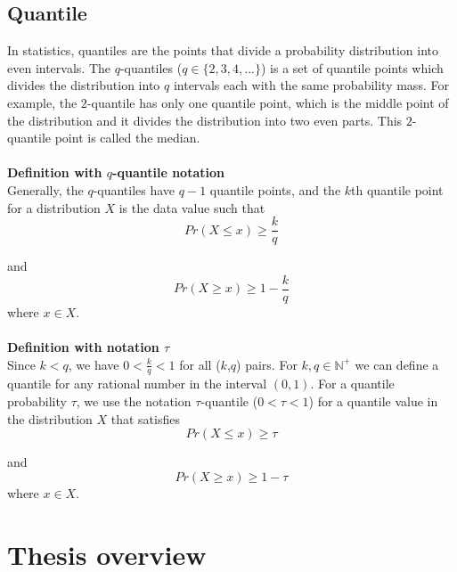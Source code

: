 \subsection{Quantile}
\label{subsec: quant}

In statistics, quantiles are the points that divide a probability distribution into even intervals.
The $q$-quantiles ($q \in \{2,3,4,...\}$) is a set of quantile points which divides the distribution into $q$ intervals each with the same probability mass.
For example, the $2$-quantile has only one quantile point, which is the middle point of the distribution
and it divides the distribution into two even parts. This $2$-quantile point is called the median.
        \\\\
    \textbf{Definition with $q$-quantile notation} \\
    Generally, the $q$-quantiles have $q-1$ quantile points, and the $k$th quantile point for a 
    distribution $X$ is the data value such that%
    \begin{equation}
        Pr(X \leq x) \geq \frac{k}{q}
    \end{equation}
    
    and%
    \begin{equation}
        Pr(X \geq x) \geq 1 - \frac{k}{q}
    \end{equation}
    where $x \in X$.
    \\\\
    \textbf{Definition with notation $\tau$}\\
    Since $k < q$, we have $0 < \frac{k}{q} < 1$ for all ($k$,$q$) pairs. For $k, q \in \mathbb{N}^+$ we can define a quantile for any rational number in the interval $(0,1)$. For a quantile probability $\tau$, we use the notation $\tau$-quantile ($0 < \tau < 1$) for a quantile value in the distribution $X$ that satisfies%
    \begin{equation}
        Pr(X \leq x) \geq \tau
    \end{equation}
    
    and%
    \begin{equation}
        Pr(X \geq x) \geq 1 - \tau
    \end{equation}
    where $x \in X$.



\section{Thesis overview}
\label{sec: intro_overview}

